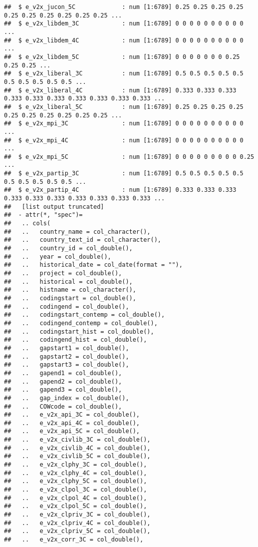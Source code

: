 \documentclass[
]{article}
\begin{document}
\begin{verbatim}
##  $ e_v2x_jucon_5C             : num [1:6789] 0.25 0.25 0.25 0.25 0.25 0.25 0.25 0.25 0.25 0.25 ...
##  $ e_v2x_libdem_3C            : num [1:6789] 0 0 0 0 0 0 0 0 0 0 ...
##  $ e_v2x_libdem_4C            : num [1:6789] 0 0 0 0 0 0 0 0 0 0 ...
##  $ e_v2x_libdem_5C            : num [1:6789] 0 0 0 0 0 0 0 0.25 0.25 0.25 ...
##  $ e_v2x_liberal_3C           : num [1:6789] 0.5 0.5 0.5 0.5 0.5 0.5 0.5 0.5 0.5 0.5 ...
##  $ e_v2x_liberal_4C           : num [1:6789] 0.333 0.333 0.333 0.333 0.333 0.333 0.333 0.333 0.333 0.333 ...
##  $ e_v2x_liberal_5C           : num [1:6789] 0.25 0.25 0.25 0.25 0.25 0.25 0.25 0.25 0.25 0.25 ...
##  $ e_v2x_mpi_3C               : num [1:6789] 0 0 0 0 0 0 0 0 0 0 ...
##  $ e_v2x_mpi_4C               : num [1:6789] 0 0 0 0 0 0 0 0 0 0 ...
##  $ e_v2x_mpi_5C               : num [1:6789] 0 0 0 0 0 0 0 0 0 0.25 ...
##  $ e_v2x_partip_3C            : num [1:6789] 0.5 0.5 0.5 0.5 0.5 0.5 0.5 0.5 0.5 0.5 ...
##  $ e_v2x_partip_4C            : num [1:6789] 0.333 0.333 0.333 0.333 0.333 0.333 0.333 0.333 0.333 0.333 ...
##   [list output truncated]
##  - attr(*, "spec")=
##   .. cols(
##   ..   country_name = col_character(),
##   ..   country_text_id = col_character(),
##   ..   country_id = col_double(),
##   ..   year = col_double(),
##   ..   historical_date = col_date(format = ""),
##   ..   project = col_double(),
##   ..   historical = col_double(),
##   ..   histname = col_character(),
##   ..   codingstart = col_double(),
##   ..   codingend = col_double(),
##   ..   codingstart_contemp = col_double(),
##   ..   codingend_contemp = col_double(),
##   ..   codingstart_hist = col_double(),
##   ..   codingend_hist = col_double(),
##   ..   gapstart1 = col_double(),
##   ..   gapstart2 = col_double(),
##   ..   gapstart3 = col_double(),
##   ..   gapend1 = col_double(),
##   ..   gapend2 = col_double(),
##   ..   gapend3 = col_double(),
##   ..   gap_index = col_double(),
##   ..   COWcode = col_double(),
##   ..   e_v2x_api_3C = col_double(),
##   ..   e_v2x_api_4C = col_double(),
##   ..   e_v2x_api_5C = col_double(),
##   ..   e_v2x_civlib_3C = col_double(),
##   ..   e_v2x_civlib_4C = col_double(),
##   ..   e_v2x_civlib_5C = col_double(),
##   ..   e_v2x_clphy_3C = col_double(),
##   ..   e_v2x_clphy_4C = col_double(),
##   ..   e_v2x_clphy_5C = col_double(),
##   ..   e_v2x_clpol_3C = col_double(),
##   ..   e_v2x_clpol_4C = col_double(),
##   ..   e_v2x_clpol_5C = col_double(),
##   ..   e_v2x_clpriv_3C = col_double(),
##   ..   e_v2x_clpriv_4C = col_double(),
##   ..   e_v2x_clpriv_5C = col_double(),
##   ..   e_v2x_corr_3C = col_double(),

\end{verbatim}
\end{document}
